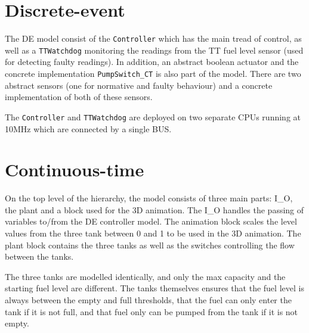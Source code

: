 
\section{Discrete-event}

The DE model consist of the \texttt{Controller} which has the main
tread of control, as well as a \texttt{TTWatchdog} monitoring the
readings from the TT fuel level sensor (used for detecting faulty
readings). In addition, an abstract boolean actuator and the concrete
implementation \texttt{PumpSwitch\-\_CT} is also part of the
model. There are two abstract sensors (one for normative and faulty
behaviour) and a concrete implementation of both of these sensors.

The \texttt{Controller} and \texttt{TTWatchdog} are deployed on two
separate CPUs running at 10MHz which are connected by a single BUS.


\section{Continuous-time}

On the top level of the hierarchy, the model consists of three main
parts: I\_O, the plant and a block used for the 3D
animation. The I\_O handles the passing of variables to/from the
DE controller model. The animation block scales the level values from
the three tank between 0 and 1 to be used in the 3D animation. The
plant block contains the three tanks as well as the switches
controlling the flow between the tanks.

The three tanks are modelled identically, and only the max capacity
and the starting fuel level are different. The tanks themselves
ensures that the fuel level is always between the empty and full
thresholds, that the fuel can only enter the tank if it is not full,
and that fuel only can be pumped from the tank if it is not empty.

